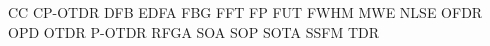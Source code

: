 
\color{white}
    \begin{tiny}
        \ac{CC}
        \ac{CP-OTDR}
        \ac{DFB}
        \ac{EDFA}
        \ac{FBG}
        \ac{FFT}
        \ac{FP}
        \ac{FUT}
        \ac{FWHM}
        \ac{MWE}
        \ac{NLSE}
        \ac{OFDR}
        \ac{OPD}
        \ac{OTDR}
        \ac{P-OTDR}
        \ac{RFGA}
        \ac{SOA}
        \ac{SOP}
        \ac{SOTA}
        \ac{SSFM}
        \ac{TDR}
        
    \end{tiny}
\color{black}